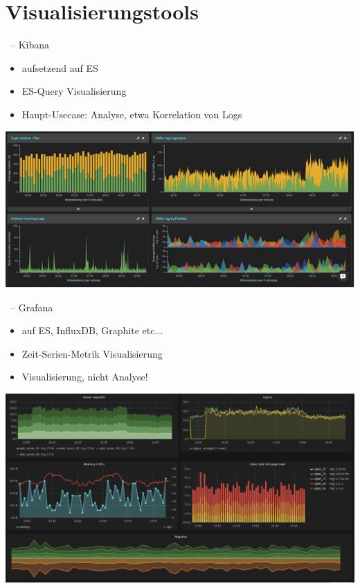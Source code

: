 \documentclass{beamer}
\begin{document}
\section{Visualisierungstools}

\begin{frame}{\insertsection\ -- Kibana}
	\begin{itemize}
		\item aufsetzend auf ES
		\item ES-Query Visualisierung
		\item Haupt-Usecase: Analyse, etwa Korrelation von Logs
	\end{itemize}
	\includegraphics[width=\linewidth,page=1]{img/kibana.png}
\end{frame}

\begin{frame}{\insertsection\ -- Grafana}
	\begin{itemize}
		\item auf ES, InfluxDB, Graphite etc...
		\item Zeit-Serien-Metrik Visualisierung
		\item Visualisierung, nicht Analyse!
	\end{itemize}
	\includegraphics[width=\linewidth,page=1]{img/grafana.png}
\end{frame}
\end{document}
